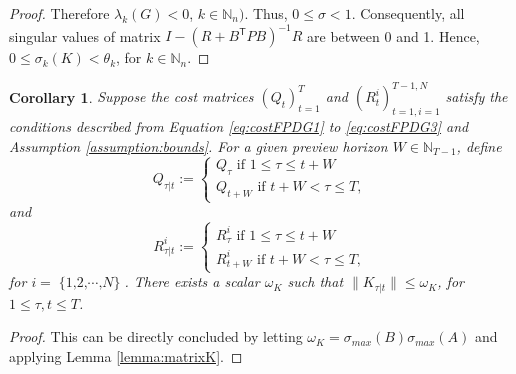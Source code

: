 \documentclass[letterpaper, 10 pt, conference]{ieeeconf}  %
\newcommand{\transpose}{\mathsf{T}}
\DeclareMathOperator{\Nplayers}{\{1,2,\cdots,\textit{N}\}}
\newtheorem{corollary}{Corollary}
\begin{document}
\begin{proof}
     Therefore $\lambda_{k}(G) < 0$, $k \in \mathbb{N}_{n})$. Thus, $0 \leq \sigma < 1$.
    Consequently, all singular values of matrix $I - (R+B^{\transpose}PB)^{-1}R$ are between 0 and 1. Hence,
        $0 \leq \sigma_{k}(K) < \theta_{k}$, for $k \in \mathbb{N}_{n}$.
\end{proof}

\begin{corollary}\label{corrolary:boundedK}
    Suppose the cost matrices $(Q_{t})_{t=1}^{T}$ and $(R_{t}^{i})_{t=1,i=1}^{T-1,N}$ satisfy the conditions described from Equation \eqref{eq:costFPDG1} to \eqref{eq:costFPDG3} and Assumption \ref{assumption:bounds}.
    For a given preview horizon $W\in \mathbb{N}_{T-1}$, define
    \begin{equation}
        Q_{\tau|t}:= 
        \begin{cases}
            Q_{\tau} \text{ if $1\leq \tau \leq t+W$}\\
            Q_{t+W} \text{ if $t+W < \tau \leq T$},
        \end{cases}
    \end{equation}
    and
    \begin{equation}
        R_{\tau|t}^{i}:= 
        \begin{cases}
            R_{\tau}^{i} \text{ if $1\leq \tau \leq t+W$}\\
            R_{t+W}^{i} \text{ if $t+W < \tau \leq T$},
        \end{cases}
    \end{equation}
    for $i = \Nplayers$.
    There exists a scalar $\omega_{K}$ such that
        $\|K_{\tau|t}\| \leq \omega_{K}$,
    for $1\leq \tau,t\leq T$.
\end{corollary}

\begin{proof}
    This can be directly concluded by letting $\omega_{K} = \sigma_{max}(B)\sigma_{max}(A)$ and applying Lemma \ref{lemma:matrixK}.
\end{proof}
\end{document}

